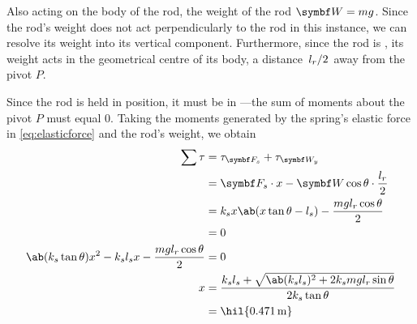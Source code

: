 Also acting on the body of the rod, the weight of the rod \(\mv{W} = mg\). Since
the rod's weight does not act perpendicularly to the rod in this instance, we
can resolve its weight into its vertical component. Furthermore, since the rod
is , its weight acts in the geometrical centre of its
body, a distance \(\lf{l_r}{2}\)
away from the pivot \(P\).

Since the rod is held in position, it must be in ---the
sum of moments about the pivot \(P\) must equal \(0\).
Taking the moments generated by the spring's elastic force in
\cref{eq:elasticforce} and the rod's weight, we obtain
\begin{align*}
  \sum\tau &= \tau_{\mv{F}_s} + \tau_{\mv{W}_y} \\
  &= \mv{F}_s\cdot x - \mv{W}\cos\theta\cdot\f{l_r}{2} \\
  &= k_sx\ab(x\tan\theta - l_s) - \f{mgl_r\cos\theta}{2} \\
  &= 0 \\
  \ab(k_s\tan\theta)x^2 - k_sl_sx -\f{mgl_r\cos\theta}{2} &= 0\\
  x&= \f{k_sl_s + \sqrt{\ab(k_sl_s)^2 + 2k_smgl_r\sin\theta}}{2k_s\tan\theta} \\
  &= \hil{\qty{0.471}{\metre}}
\end{align*}


